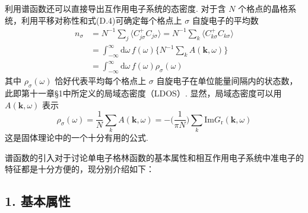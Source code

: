 利用谱函数还可以直接导出互作用电子系统的态密度. 对于含 $N$ 个格点的晶格系统，利用平移对称性和式(D.4)可确定每个格点上 $\sigma$ 自旋电子的平均数
\begin{equation}
\begin{aligned}
n_{\sigma}&=N^{-1}\sum_{j}\langle C_{j\sigma}^{+}C_{j\sigma}\rangle
=N^{-1}\sum_{k}\langle C_{k\sigma}^{+}C_{k\sigma}\rangle\\
&=\int_{-\infty}^{\infty}\mathrm{d}\omega\,f(\omega)
\biggl\{N^{-1}\sum_{k}A(\boldsymbol{k},\omega)\biggr\}\\
&=\int_{-\infty}^{\infty}\mathrm{d}\omega\,f(\omega)\rho_{\sigma}(\omega)
\end{aligned}
\end{equation}
其中 $\rho_{\sigma}(\omega)$ 恰好代表平均每个格点上 $\sigma$ 自旋电子在单位能量间隔内的状态数，此即第十一章§1中所定义的局域态密度（LDOS）. 显然，局域态密度可以用 $A(\boldsymbol{k},\omega)$ 表示
\begin{equation}
\rho_{\sigma}(\omega)=\frac{1}{N}\sum_{k}A(\boldsymbol{k},\omega)
=-\biggl(\frac{1}{\pi N}\biggr)\sum_{k}
\mathrm{Im}G_{\mathrm{r}}(\boldsymbol{k},\omega)
\end{equation}
这是固体理论中的一个十分有用的公式.

谱函数的引入对于讨论单电子格林函数的基本属性和相互作用电子系统中准电子的特征都是十分方便的，现分别介绍如下：

\subsection*{1. 基本属性}

